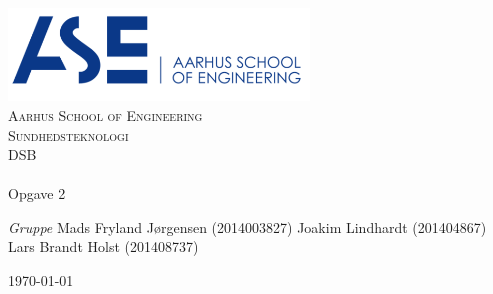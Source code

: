 \begin{titlingpage}
\begin{center}

~ \\[3cm]

\includegraphics[width=0.6\textwidth]{Figurer/ASE}~\\[1cm]

\textsc{\LARGE Aarhus School of Engineering}\\[1.5cm]

\textsc{\Large Sundhedsteknologi}\\
\textsc{\Large DSB }\\[0.5cm]

\noindent\makebox[\linewidth]{\rule{\textwidth}{0.4pt}}\\
[0.5cm]{\Huge Opgave 2}
\noindent\makebox[\linewidth]{\rule{\textwidth}{0.4pt}}

\end{center}

\textit{Gruppe} \newline
Mads Fryland J\o rgensen (2014003827) \newline
Joakim Lindhardt (201404867) \newline
Lars Brandt Holst (201408737)\newline





\vfill

\begin{center}
{\large \today}
\end{center}


\end{titlingpage}